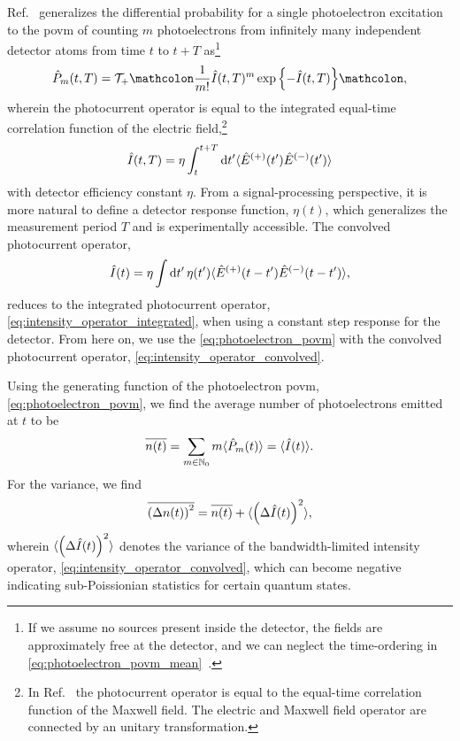 Ref.~\cite[p.~725]{Mandel1995} generalizes the differential probability for a single photoelectron excitation to the \gls{povm} of counting $m$ photoelectrons from infinitely many independent detector atoms from time $t$ to $t+T$ as\footnote{If we assume no sources present inside the detector, the fields are approximately free at the detector, and we can neglect the time-ordering in \cref{eq:photoelectron_povm_mean}~\cite[p.~183]{Vogel2006}.}
\begin{equation}
	\hat{P}_m(t,T)
	=
	\mathcal{T}_+
	\norder{
		\frac{1}{m!}
		\hat{I}(t,T)^m
		\exp\left\{
			-\hat{I}(t,T)
		\right\}
	}
	\label{eq:photoelectron_povm}
	,	
\end{equation}
wherein the photocurrent operator is equal to the integrated equal-time correlation function of the electric field,\footnote{In Ref.~\cite{Mandel1995} the photocurrent operator is equal to the equal-time correlation function of the Maxwell field. The electric and Maxwell field operator are connected by an unitary transformation.}
\begin{align}
	\hat{I}(t,T)
	=
	\eta
	\int_t^{t+T}\dd{t^\prime}
	\expval{
		\hat{E}^{(+)}(t^\prime)
		\hat{E}^{(-)}(t^\prime)
	}
	\label{eq:intensity_operator_integrated}
\end{align}
with detector efficiency constant $\eta$.
From a signal-processing perspective, it is more natural to define a detector response function, $\eta(t)$, which generalizes the measurement period $T$ and is experimentally accessible.
The convolved photocurrent operator,
\begin{align}
	\hat{I}(t)
	=
	\eta
	\int\dd{t^\prime}
	\eta(t^\prime)
	\expval{
		\hat{E}^{(+)}(t-t^\prime)
		\hat{E}^{(-)}(t-t^\prime)
	}
	\label{eq:intensity_operator_convolved}
	,
\end{align}
reduces to the integrated photocurrent operator, \cref{eq:intensity_operator_integrated}, when using a constant step response for the detector.
From here on, we use the \cref{eq:photoelectron_povm} with the convolved photocurrent operator, \cref{eq:intensity_operator_convolved}.

Using the generating function of the photoelectron \gls{povm}, \cref{eq:photoelectron_povm}, we find the average number of photoelectrons emitted at $t$ to be~\cite[p.~183]{Vogel2006}
\begin{equation}
	\overline{n(t)}
	=
	\sum_{m\in\mathbb{N}_0}
	m
	\langle\hat{P}_m(t)\rangle
	=
	\langle\hat{I}(t)\rangle
	\label{eq:photoelectron_povm_mean}
	.
\end{equation}
For the variance, we find~\cite[p.~736]{Mandel1995}
\begin{equation}
	\overline{\left(\Delta n(t)\right)^2}
	=
	\overline{n(t)}
	+
	\langle\left(\Delta\hat{I}(t)\right)^2\rangle
	\label{eq:photoelectron_povm_var}
	,
\end{equation}
wherein $\langle\left(\Delta\hat{I}(t)\right)^2\rangle$ denotes the variance of the bandwidth-limited intensity operator, \cref{eq:intensity_operator_convolved}, which can become negative indicating sub-Poissionian statistics for certain quantum states.

